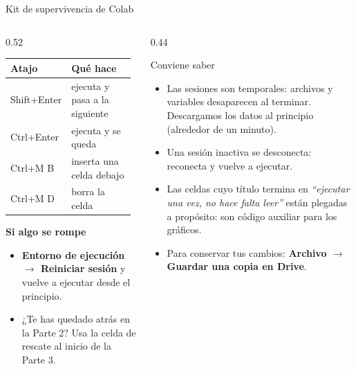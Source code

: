 \begin{frame}{Kit de supervivencia de Colab}
  \begin{columns}[T]
    \begin{column}{0.52\linewidth}
      \small
      \begin{tabular}{@{}>{\ttfamily}p{0.38\linewidth}p{0.58\linewidth}@{}}
        \toprule
        \textrm{\textbf{Atajo}} & \textbf{Qué hace}\\\midrule
        Shift+Enter & ejecuta y pasa a la siguiente\\
        Ctrl+Enter & ejecuta y se queda\\
        Ctrl+M B & inserta una celda debajo\\
        Ctrl+M D & borra la celda\\
        \bottomrule
      \end{tabular}
      \vspace{0.3cm}

      \textbf{Si algo se rompe}
      \begin{itemize}\footnotesize\setlength\itemsep{2pt}
        \item \textbf{Entorno de ejecución $\rightarrow$ Reiniciar sesión} y vuelve a ejecutar desde el principio.
        \item ¿Te has quedado atrás en la Parte 2? Usa la \alert{celda de rescate} al inicio de la Parte 3.
      \end{itemize}
    \end{column}
    \begin{column}{0.44\linewidth}
      \begin{block}{Conviene saber}
        \footnotesize
        \begin{itemize}\setlength\itemsep{3pt}
          \item Las sesiones son \alert{temporales}: archivos y variables desaparecen al terminar. Descargamos los datos al principio (alrededor de un minuto).
          \item Una sesión inactiva se desconecta: reconecta y vuelve a ejecutar.
          \item Las celdas cuyo título termina en \emph{``ejecutar una vez, no hace falta leer''} están plegadas a propósito: son código auxiliar para los gráficos.
          \item Para conservar tus cambios: \textbf{Archivo $\rightarrow$ Guardar una copia en Drive}.
        \end{itemize}
      \end{block}
    \end{column}
  \end{columns}
\end{frame}

